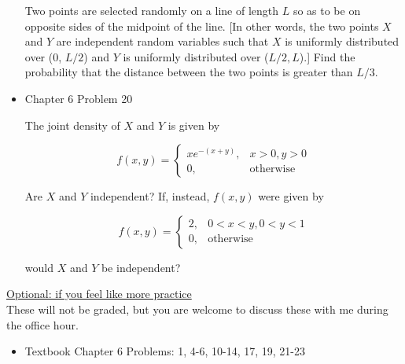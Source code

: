 \documentclass[11pt]{article}
\begin{document}
\begin{itemize}
    Two points are selected randomly on a line of length $L$ so as to be on opposite sides of the midpoint of the line. [In other words, the two points $X$ and $Y$ are independent random variables such that $X$ is uniformly distributed over (0, $L/2$) and $Y$ is uniformly distributed over ($L/2, L$).] Find the probability that the distance between the two points is greater than $L/3$.

    \item
    Chapter 6 Problem 20
    
    The joint density of $X$ and $Y$ is given by
    
    \begin{equation*}
    f(x, y) =
    \begin{cases}
      xe^{-(x+y)}, & x > 0, y > 0 \\
      0, & \text{otherwise}
    \end{cases}
    \end{equation*}
  
    Are $X$ and $Y$ independent? If, instead, $f(x, y)$ were given by
    
    \begin{equation*}
    f(x, y) =
    \begin{cases}
      2, & 0 < x < y, 0 < y < 1 \\
      0, & \text{otherwise}
    \end{cases}
    \end{equation*}
    
    would $X$ and $Y$ be independent?

\end{itemize}


\vspace{12pt}

\underline{Optional: if you feel like more practice}\\
These will not be graded, but you are welcome to discuss these with me during the office hour.

\begin{itemize}


\item Textbook  Chapter 6 Problems: 1, 4-6, 10-14, 17, 19, 21-23

\end{itemize}
\end{document}
